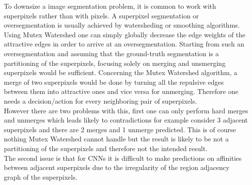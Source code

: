 To downsize a image segmentation problem, it is common to work with superpixels \cite{10.1007/978-3-642-23094-3_3} rather than  with pixels. A superpixel segmentation or oversegmentation is usually achieved by watersheding or smoothing algorithms.
Using Mutex Watershed one can simply globally decrease the edge weights of the attractive edges in order to arrive at an oversegmentation.
Starting from such an oversegmentation and assuming that the ground-truth segmentation is a partitioning of the superpixels, focusing solely on merging and unsmerging superpixels would be sufficient. Concerning the Mutex Watershed algorithm, a merge of two superpixels would be done by turning all the repulsive edges between them into attractive ones and vice versa for unmerging. Therefore one needs a decision/action for every neighboring pair of superpixels.\\
However there are two problems with this, first one can only perform hard merges and unmerges which leads likely to contradictions for example consider 3 adjacent superpixels and there are 2 merges and 1 unmerge predicted. This is of course nothing Mutex Watershed cannot handle but the result is likely to be not a partitioning of the superpixels and therefore not the intended result.\\
The second issue is that for CNNs it is difficult to make predictions on affinities between adjacent superpixels due to the irregularity of the region adjacency graph of the superpixels.